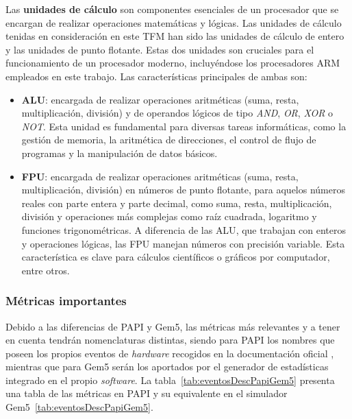\par{Las \textbf{unidades de cálculo} son componentes esenciales de un procesador que se encargan de realizar operaciones matemáticas y lógicas. Las unidades de cálculo tenidas en consideración en este \ac{TFM} han sido las unidades de cálculo de entero y las unidades de punto flotante. Estas dos unidades son cruciales para el funcionamiento de un procesador moderno, incluyéndose los procesadores \ac{ARM} empleados en este trabajo. Las características principales de ambas son:

\begin{itemize}
      \item \textbf{\ac{ALU}}: encargada de realizar operaciones aritméticas (suma, resta, multiplicación, división) y de operandos lógicos de tipo \emph{AND}, \emph{OR}, \emph{XOR} o \emph{NOT}. Esta unidad es fundamental para diversas tareas informáticas, como la gestión de memoria, la aritmética de direcciones, el control de flujo de programas y la manipulación de datos básicos.
    
      \item \textbf{\ac{FPU}}: encargada de realizar operaciones aritméticas (suma, resta, multiplicación, división) en números de punto flotante, para aquelos números reales con parte entera y parte decimal, como suma, resta, multiplicación, división y operaciones más complejas como raíz cuadrada, logaritmo y funciones trigonométricas. A diferencia de las \ac{ALU}, que trabajan con enteros y operaciones lógicas, las \ac{FPU} manejan números con precisión variable. Esta característica es clave para cálculos científicos o gráficos por computador, entre otros.
\end{itemize}
}

\subsubsection{Métricas importantes}
\label{metricasGem5PAPI}
Debido a las diferencias de \ac{PAPI} y Gem5, las métricas más relevantes y a tener en cuenta tendrán nomenclaturas distintas, siendo para \ac{PAPI} los nombres que poseen los propios eventos de \textit{hardware} recogidos en la documentación oficial \cite{referencia-a72}, mientras que para Gem5 serán los aportados por el generador de estadísticas integrado en el propio \textit{software}. La tabla~\ref{tab:eventosDescPapiGem5} presenta una tabla de las métricas en \ac{PAPI} y su equivalente en el simulador Gem5~\ref{tab:eventosDescPapiGem5}.

